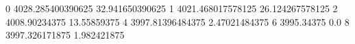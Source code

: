 0 4028.285400390625 32.941650390625
1 4021.468017578125 26.124267578125
2 4008.90234375 13.55859375
4 3997.81396484375 2.47021484375
6 3995.34375 0.0
8 3997.326171875 1.982421875
